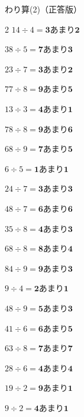 \documentclass[paper=a4, fontsize=11pt, jafontsize=11pt]{jlreq}
\begin{document}
\begin{center}
    {\Large わり算(2)（正答版）} \\
    \vspace*{3ex}
\end{center}
\vspace*{3ex}
\begin{multicols*}{2}
$ 14 \div 4 = \bm{3} 　あまり　 \bm{2}$ \vspace*{\fill} 

$ 38 \div 5 = \bm{7} 　あまり　 \bm{3}$ \vspace*{\fill} 

$ 23 \div 7 = \bm{3} 　あまり　 \bm{2}$ \vspace*{\fill} 

$ 77 \div 8 = \bm{9} 　あまり　 \bm{5}$ \vspace*{\fill} 

$ 13 \div 3 = \bm{4} 　あまり　 \bm{1}$ \vspace*{\fill} 

$ 78 \div 8 = \bm{9} 　あまり　 \bm{6}$ \vspace*{\fill} 

$ 68 \div 9 = \bm{7} 　あまり　 \bm{5}$ \vspace*{\fill} 

$ 6 \div 5 = \bm{1} 　あまり　 \bm{1}$ \vspace*{\fill} 

$ 24 \div 7 = \bm{3} 　あまり　 \bm{3}$ \vspace*{\fill} 

$ 48 \div 7 = \bm{6} 　あまり　 \bm{6}$ \vspace*{\fill} 

\columnbreak 
$ 35 \div 8 = \bm{4} 　あまり　 \bm{3}$ \vspace*{\fill} 

$ 68 \div 8 = \bm{8} 　あまり　 \bm{4}$ \vspace*{\fill} 

$ 84 \div 9 = \bm{9} 　あまり　 \bm{3}$ \vspace*{\fill} 

$ 9 \div 4 = \bm{2} 　あまり　 \bm{1}$ \vspace*{\fill} 

$ 48 \div 9 = \bm{5} 　あまり　 \bm{3}$ \vspace*{\fill} 

$ 41 \div 6 = \bm{6} 　あまり　 \bm{5}$ \vspace*{\fill} 

$ 63 \div 8 = \bm{7} 　あまり　 \bm{7}$ \vspace*{\fill} 

$ 28 \div 6 = \bm{4} 　あまり　 \bm{4}$ \vspace*{\fill} 

$ 19 \div 2 = \bm{9} 　あまり　 \bm{1}$ \vspace*{\fill} 

$ 9 \div 2 = \bm{4} 　あまり　 \bm{1}$ \vspace*{\fill} 

\end{multicols*}
\end{document}
